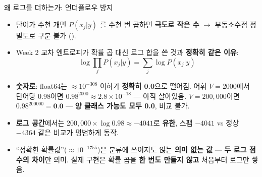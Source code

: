 \begin{frame}{왜 로그를 더하는가: 언더플로우 방지}
  \begin{itemize}
    \item 단어가 수천 개면 $P(x_j|y)$ 를 수천 번 곱하면
      \textbf{극도로 작은 수} $\to$ 부동소수점 정밀도로 구분 불가
      ().
    \item Week 2 교차 엔트로피가 확률 곱 대신 로그 합을 쓴 것과
      \textbf{정확히 같은 이유}:
      \[ \log\prod_j P(x_j|y) = \sum_j \log P(x_j|y) \]
    \item \textbf{숫자로}: float64는 $\approx10^{-308}$ 이하가
      \textbf{정확히 0.0}으로 떨어짐.
      어휘 $V{=}2000$에서 단어당 0.98이면
      $0.98^{2000}\approx2.8\times10^{-18}$ --- 아직 살아있음.
      $V{=}200{,}000$이면 $0.98^{200000}=\textbf{0.0}$ ---
      \textbf{양 클래스 가능도 모두 0.0}, 비교 불가.
    \item \textbf{로그 공간}에서는 $200{,}000\times\log 0.98
      \approx -4041$로 \textbf{유한}, 스팸 $-4041$ vs 정상 $-4364$
      같은 비교가 평범하게 동작.
    \item ``정확한 확률값''($\approx10^{-1755}$)은 분류에 쓰이지도
      않는 \textbf{의미 없는 값} --- \textbf{두 로그 점수의 차이}만
      의미. 실제 구현은 확률 곱을 \textbf{한 번도 만들지 않고}
      처음부터 로그만 쌓음.
  \end{itemize}
\end{frame}
